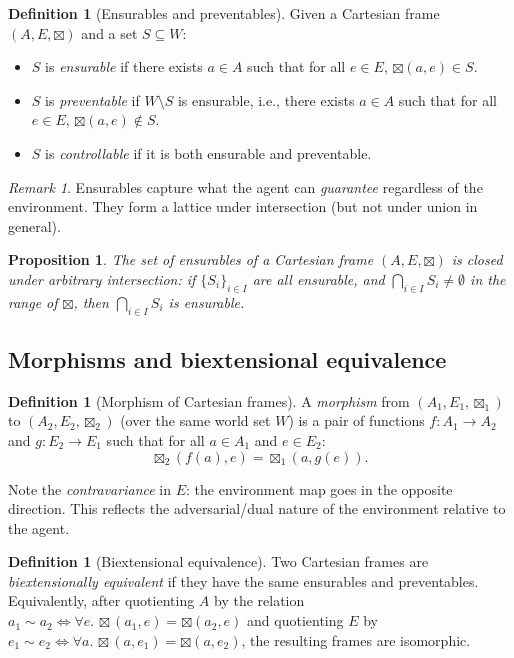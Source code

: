 \documentclass[11pt,a4paper]{article}
\newtheorem{proposition}[theorem]{Proposition}
\theoremstyle{definition}
\newtheorem{definition}[theorem]{Definition}
\theoremstyle{remark}
\newtheorem{remark}[theorem]{Remark}
\begin{document}
\begin{definition}[Ensurables and preventables]
Given a Cartesian frame $(A, E, \boxtimes)$ and a set $S \subseteq W$:
\begin{itemize}
  \item $S$ is \emph{ensurable} if there exists $a \in A$ such that
    for all $e \in E$, $\boxtimes(a, e) \in S$.
  \item $S$ is \emph{preventable} if $W \setminus S$ is ensurable,
    i.e., there exists $a \in A$ such that for all $e \in E$,
    $\boxtimes(a, e) \notin S$.
  \item $S$ is \emph{controllable} if it is both ensurable and
    preventable.
\end{itemize}
\end{definition}

\begin{remark}
Ensurables capture what the agent can \emph{guarantee} regardless of
the environment.  They form a lattice under intersection (but not under
union in general).
\end{remark}

\begin{proposition}
The set of ensurables of a Cartesian frame $(A, E, \boxtimes)$ is
closed under arbitrary intersection: if $\{S_i\}_{i \in I}$ are all
ensurable, and $\bigcap_{i \in I} S_i \neq \emptyset$ in the range of
$\boxtimes$, then $\bigcap_{i \in I} S_i$ is ensurable.
\end{proposition}

\subsection{Morphisms and biextensional equivalence}

\begin{definition}[Morphism of Cartesian frames]
A \emph{morphism} from $(A_1, E_1, \boxtimes_1)$ to
$(A_2, E_2, \boxtimes_2)$ (over the same world set $W$) is a pair of
functions $f : A_1 \to A_2$ and $g : E_2 \to E_1$ such that for all
$a \in A_1$ and $e \in E_2$:
\[
  \boxtimes_2(f(a), e) = \boxtimes_1(a, g(e)).
\]
\end{definition}

Note the \emph{contravariance} in $E$: the environment map goes in the
opposite direction.  This reflects the adversarial/dual nature of the
environment relative to the agent.

\begin{definition}[Biextensional equivalence]
Two Cartesian frames are \emph{biextensionally equivalent} if they have
the same ensurables and preventables.  Equivalently, after quotienting
$A$ by the relation $a_1 \sim a_2 \iff \forall e.\, \boxtimes(a_1, e)
= \boxtimes(a_2, e)$ and quotienting $E$ by
$e_1 \sim e_2 \iff \forall a.\, \boxtimes(a, e_1) = \boxtimes(a, e_2)$,
the resulting frames are isomorphic.
\end{definition}
\end{document}
